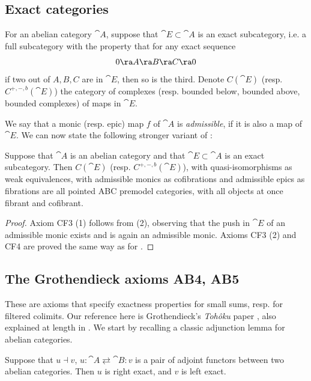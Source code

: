\subsection*{Exact categories}
For an abelian category ${\cat A}$, suppose that ${\cat E} \subset {\cat A}$ is an exact subcategory, i.e. a full subcategory with the property that for any exact sequence
\[
0 \ra A \ra B \ra C \ra 0
\]
if two out of $A, B, C$ are in ${\cat E}$, then so is the third. Denote $C({\cat E})$ (resp. $C^{+, -, b}({\cat E})$) the category of complexes (resp. bounded below, bounded above, bounded complexes) of maps in ${\cat E}$. 

We say that a monic (resp. epic) map $f$ of ${\cat A}$ is {\it admissible}, if it is also a map of ${\cat E}$. We can now state the following stronger variant of :

\begin{thm}
\label{thm:abcatisabccat2}
Suppose that ${\cat A}$ is an abelian category and that ${\cat E} \subset {\cat A}$ is an exact subcategory. Then $C({\cat E})$ (resp. $C^{+,-,b}({\cat E})$), with quasi-isomorphisms as weak equivalences, with admissible monics as cofibrations and admissible epics as fibrations are all pointed ABC premodel categories, with all objects at once fibrant and cofibrant.
\end{thm}

\begin{proof}
Axiom CF3 (1) follows from  (2), observing that the push in ${\cat E}$ of an admissible monic exists and is again an admissible monic. Axioms CF3 (2) and CF4 are proved the same way as for .
\end{proof}

\subsection*{The Grothendieck axioms AB4, AB5} 
These are axioms that specify exactness properties for small sums, resp. for filtered colimits. Our reference here is Grothendieck's {\it Toh\^{o}ku} paper \cite{Grothendieck4}, also explained at length in \cite{Popescu1}. We start by recalling a classic adjunction lemma for abelian categories. 

\begin{lem}
\label{lem:adjabelian}
Suppose that $u \dashv v$, $u \colon {\cat A} \rightleftarrows {\cat B} \colon v$ is a pair of adjoint functors between two abelian categories. Then $u$ is right exact, and $v$ is left exact.
\end{lem}

